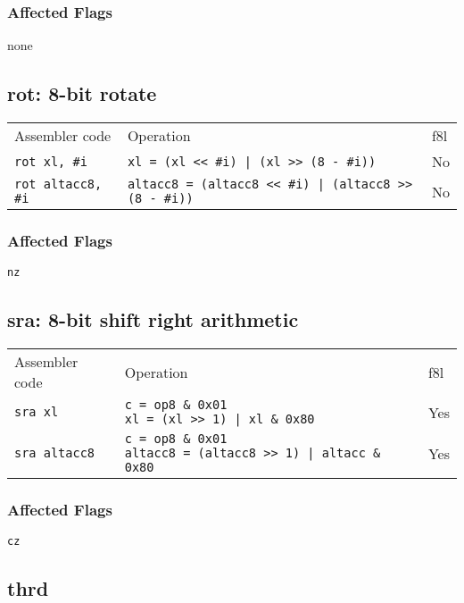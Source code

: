 \documentclass{book}
\begin{document}
\subsubsection*{Affected Flags}

none

\subsection{rot: 8-bit rotate}

\begin{tabular}{l l l}
Assembler code            & Operation                                                    & f8l \\
\texttt{rot xl, \#i}      & \texttt{xl = (xl << \#i) | (xl >> (8 - \#i))}                & No \\
\texttt{rot altacc8, \#i} & \texttt{altacc8 = (altacc8 << \#i) | (altacc8 >> (8 - \#i))} & No \\
\end{tabular}

\subsubsection*{Affected Flags}

\texttt{nz}


\subsection{sra: 8-bit shift right arithmetic}

\begin{tabular}{l l l}
Assembler code       & Operation                                                                               & f8l \\
\texttt{sra xl}      & \makecell{\texttt{c = op8 \& 0x01}\\\texttt{xl = (xl >> 1) | xl \& 0x80}}               & Yes \\
\texttt{sra altacc8} & \makecell{\texttt{c = op8 \& 0x01}\\\texttt{altacc8 = (altacc8 >> 1) | altacc \& 0x80}} & Yes
\end{tabular}

\subsubsection*{Affected Flags}

\texttt{cz}


\subsection{thrd}
\end{document}
